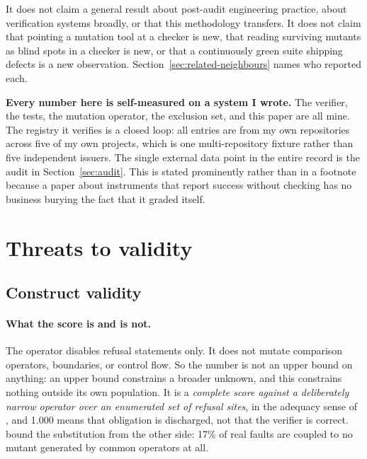 \documentclass[11pt]{article}
\begin{document}
It does not claim a general result about post-audit engineering practice, about verification
systems broadly, or that this methodology transfers. It does not claim that pointing a
mutation tool at a checker is new, that reading surviving mutants as blind spots in a checker
is new, or that a continuously green suite shipping defects is a new observation.
Section~\ref{sec:related-neighbours} names who reported each.

\textbf{Every number here is self-measured on a system I wrote.} The verifier, the tests, the
mutation operator, the exclusion set, and this paper are all mine. The registry it verifies is
a closed loop: all entries are from my own repositories across five of my own projects, which
is one multi-repository fixture rather than five independent issuers. The single external data
point in the entire record is the audit in Section~\ref{sec:audit}. This is stated prominently
rather than in a footnote because a paper about instruments that report success without
checking has no business burying the fact that it graded itself.

\section{Threats to validity}
\label{sec:threats}

\subsection{Construct validity}
\label{sec:limits-score}

\paragraph{What the score is and is not.} The operator disables refusal statements only. It
does not mutate comparison operators, boundaries, or control flow. So the number is not an
upper bound on anything: an upper bound constrains a broader unknown, and this constrains
nothing outside its own population. It is a \emph{complete score against a deliberately narrow
operator over an enumerated set of refusal sites}, in the adequacy sense of
\citet{zhu1997adequacy}, and 1.000 means that obligation is discharged, not that the verifier
is correct. \citet{just2014mutants} bound the substitution from the other side: 17\% of real
faults are coupled to no mutant generated by common operators at all.
\end{document}
